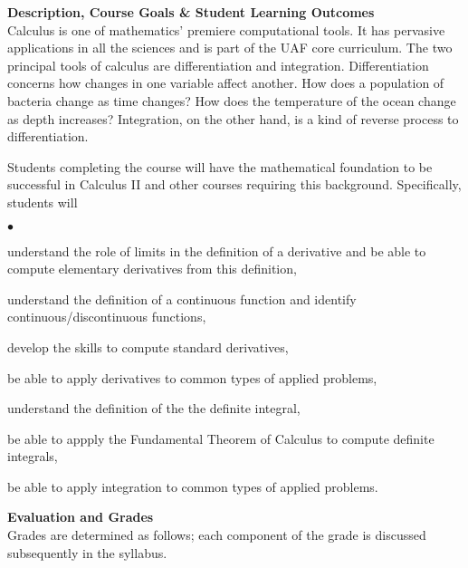 \documentclass[12pt]{article}
\renewcommand{\emph}[1]{\textsf{\textbf{#1}}}
\newcommand{\localhead}[1]{\par\smallskip\textbf{#1}\nobreak\\}%
\def\heading#1{\localhead{\large\emph{#1}}}
\newenvironment{clist}%
{\bgroup\parskip 0pt\begin{list}{$\bullet$}{\partopsep 4pt\topsep 0pt\itemsep -2pt}}%
{\end{list}\egroup}%
\begin{document}
\heading{Description, Course Goals \& Student Learning Outcomes}
Calculus is one of mathematics' premiere computational tools.  It has
pervasive applications in all the sciences and is part of the UAF core 
curriculum.  The two principal tools of calculus are differentiation and integration. Differentiation concerns how changes in one variable affect another.
How does a population of bacteria change as time changes?  
How does the temperature of the ocean change as depth increases?
Integration, on the other hand, is a kind of reverse process to
differentiation. 

Students completing the course will have the mathematical foundation to be successful in Calculus II and other courses
requiring this background.  Specifically, students will
\begin{clist}
\item understand the role of limits in the definition of a derivative 
and be able to compute elementary derivatives from this definition,
\item understand the definition of a continuous function and identify
continuous/discontinuous functions,
\item develop the skills to compute standard derivatives,
\item be able to apply derivatives to common types of applied problems,
\item understand the definition of the the definite integral,
\item be able to appply the Fundamental Theorem of Calculus to
compute definite integrals,
\item be able to apply integration to common types of applied problems.
\end{clist}

\heading{Evaluation and Grades}
Grades are determined as follows; 
each component of the grade is discussed subsequently in
the syllabus.
 
\end{document}
